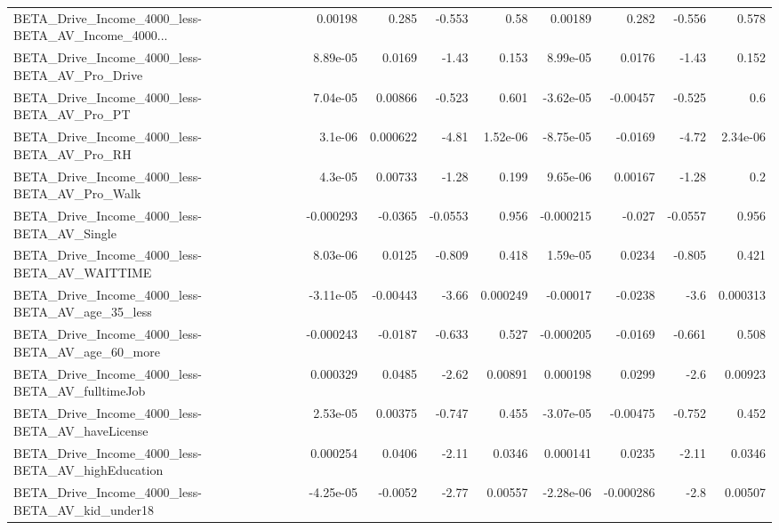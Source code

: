 \begin{tabular}{lrrrrrrrr}
BETA\_Drive\_Income\_4000\_less-BETA\_AV\_Income\_4000... &     0.00198 &        0.285 &    -0.553 &     0.58 &    0.00189 &       0.282 &       -0.556 &         0.578 \\
BETA\_Drive\_Income\_4000\_less-BETA\_AV\_Pro\_Drive      &    8.89e-05 &       0.0169 &     -1.43 &    0.153 &   8.99e-05 &      0.0176 &        -1.43 &         0.152 \\
BETA\_Drive\_Income\_4000\_less-BETA\_AV\_Pro\_PT         &    7.04e-05 &      0.00866 &    -0.523 &    0.601 &  -3.62e-05 &    -0.00457 &       -0.525 &           0.6 \\
BETA\_Drive\_Income\_4000\_less-BETA\_AV\_Pro\_RH         &     3.1e-06 &     0.000622 &     -4.81 & 1.52e-06 &  -8.75e-05 &     -0.0169 &        -4.72 &      2.34e-06 \\
BETA\_Drive\_Income\_4000\_less-BETA\_AV\_Pro\_Walk       &     4.3e-05 &      0.00733 &     -1.28 &    0.199 &   9.65e-06 &     0.00167 &        -1.28 &           0.2 \\
BETA\_Drive\_Income\_4000\_less-BETA\_AV\_Single         &   -0.000293 &      -0.0365 &   -0.0553 &    0.956 &  -0.000215 &      -0.027 &      -0.0557 &         0.956 \\
BETA\_Drive\_Income\_4000\_less-BETA\_AV\_WAITTIME       &    8.03e-06 &       0.0125 &    -0.809 &    0.418 &   1.59e-05 &      0.0234 &       -0.805 &         0.421 \\
BETA\_Drive\_Income\_4000\_less-BETA\_AV\_age\_35\_less    &   -3.11e-05 &     -0.00443 &     -3.66 & 0.000249 &   -0.00017 &     -0.0238 &         -3.6 &      0.000313 \\
BETA\_Drive\_Income\_4000\_less-BETA\_AV\_age\_60\_more    &   -0.000243 &      -0.0187 &    -0.633 &    0.527 &  -0.000205 &     -0.0169 &       -0.661 &         0.508 \\
BETA\_Drive\_Income\_4000\_less-BETA\_AV\_fulltimeJob    &    0.000329 &       0.0485 &     -2.62 &  0.00891 &   0.000198 &      0.0299 &         -2.6 &       0.00923 \\
BETA\_Drive\_Income\_4000\_less-BETA\_AV\_haveLicense    &    2.53e-05 &      0.00375 &    -0.747 &    0.455 &  -3.07e-05 &    -0.00475 &       -0.752 &         0.452 \\
BETA\_Drive\_Income\_4000\_less-BETA\_AV\_highEducation  &    0.000254 &       0.0406 &     -2.11 &   0.0346 &   0.000141 &      0.0235 &        -2.11 &        0.0346 \\
BETA\_Drive\_Income\_4000\_less-BETA\_AV\_kid\_under18    &   -4.25e-05 &      -0.0052 &     -2.77 &  0.00557 &  -2.28e-06 &   -0.000286 &         -2.8 &       0.00507 \\

\end{tabular}
